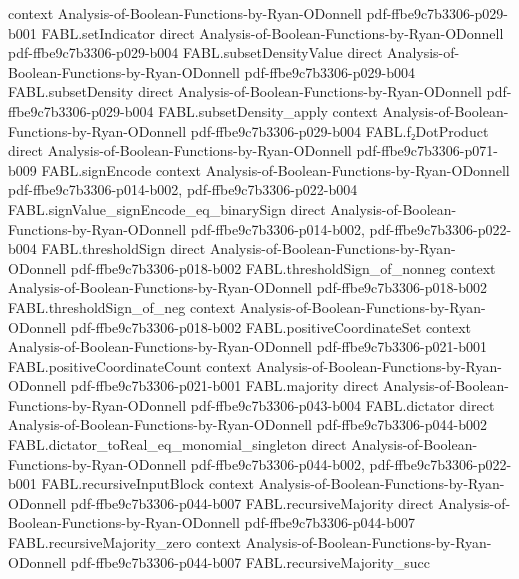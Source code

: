 \begin{theorem}
  {context}
  {Analysis-of-Boolean-Functions-by-Ryan-ODonnell}
  {pdf-ffbe9c7b3306-p029-b001}
\proofstep
  {FABL.setIndicator}
  {direct}
  {Analysis-of-Boolean-Functions-by-Ryan-ODonnell}
  {pdf-ffbe9c7b3306-p029-b004}
\proofstep
  {FABL.subsetDensityValue}
  {direct}
  {Analysis-of-Boolean-Functions-by-Ryan-ODonnell}
  {pdf-ffbe9c7b3306-p029-b004}
\proofstep
  {FABL.subsetDensity}
  {direct}
  {Analysis-of-Boolean-Functions-by-Ryan-ODonnell}
  {pdf-ffbe9c7b3306-p029-b004}
\proofstep
  {FABL.subsetDensity_apply}
  {context}
  {Analysis-of-Boolean-Functions-by-Ryan-ODonnell}
  {pdf-ffbe9c7b3306-p029-b004}
\proofstep
  {FABL.f₂DotProduct}
  {direct}
  {Analysis-of-Boolean-Functions-by-Ryan-ODonnell}
  {pdf-ffbe9c7b3306-p071-b009}
\proofstep
  {FABL.signEncode}
  {context}
  {Analysis-of-Boolean-Functions-by-Ryan-ODonnell}
  {pdf-ffbe9c7b3306-p014-b002,
    pdf-ffbe9c7b3306-p022-b004}
\proofstep
  {FABL.signValue_signEncode_eq_binarySign}
  {direct}
  {Analysis-of-Boolean-Functions-by-Ryan-ODonnell}
  {pdf-ffbe9c7b3306-p014-b002,
    pdf-ffbe9c7b3306-p022-b004}
\proofstep
  {FABL.thresholdSign}
  {direct}
  {Analysis-of-Boolean-Functions-by-Ryan-ODonnell}
  {pdf-ffbe9c7b3306-p018-b002}
\proofstep
  {FABL.thresholdSign_of_nonneg}
  {context}
  {Analysis-of-Boolean-Functions-by-Ryan-ODonnell}
  {pdf-ffbe9c7b3306-p018-b002}
\proofstep
  {FABL.thresholdSign_of_neg}
  {context}
  {Analysis-of-Boolean-Functions-by-Ryan-ODonnell}
  {pdf-ffbe9c7b3306-p018-b002}
\proofstep
  {FABL.positiveCoordinateSet}
  {context}
  {Analysis-of-Boolean-Functions-by-Ryan-ODonnell}
  {pdf-ffbe9c7b3306-p021-b001}
\proofstep
  {FABL.positiveCoordinateCount}
  {context}
  {Analysis-of-Boolean-Functions-by-Ryan-ODonnell}
  {pdf-ffbe9c7b3306-p021-b001}
\proofstep
  {FABL.majority}
  {direct}
  {Analysis-of-Boolean-Functions-by-Ryan-ODonnell}
  {pdf-ffbe9c7b3306-p043-b004}
\proofstep
  {FABL.dictator}
  {direct}
  {Analysis-of-Boolean-Functions-by-Ryan-ODonnell}
  {pdf-ffbe9c7b3306-p044-b002}
\proofstep
  {FABL.dictator_toReal_eq_monomial_singleton}
  {direct}
  {Analysis-of-Boolean-Functions-by-Ryan-ODonnell}
  {pdf-ffbe9c7b3306-p044-b002,
    pdf-ffbe9c7b3306-p022-b001}
\proofstep
  {FABL.recursiveInputBlock}
  {context}
  {Analysis-of-Boolean-Functions-by-Ryan-ODonnell}
  {pdf-ffbe9c7b3306-p044-b007}
\proofstep
  {FABL.recursiveMajority}
  {direct}
  {Analysis-of-Boolean-Functions-by-Ryan-ODonnell}
  {pdf-ffbe9c7b3306-p044-b007}
\proofstep
  {FABL.recursiveMajority_zero}
  {context}
  {Analysis-of-Boolean-Functions-by-Ryan-ODonnell}
  {pdf-ffbe9c7b3306-p044-b007}
\proofstep
  {FABL.recursiveMajority_succ}

\end{theorem}

